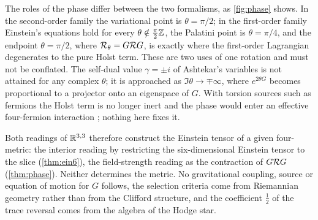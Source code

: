 The roles of the phase differ between the two formalisms, as \cref{fig:phase} shows. In the second-order family the variational point is $\theta=\pi/2$; in the
first-order family Einstein's equations hold for every $\theta\notin\tfrac\pi2\mathbb{Z}$, the Palatini point is $\theta=\pi/4$, and the endpoint $\theta=\pi/2$, where $\mathcal R_\theta=G\mathcal R G$, is
exactly where the first-order Lagrangian degenerates to the pure Holst term. These are two uses of one rotation and must not be conflated. The self-dual value
$\gamma=\pm i$ of Ashtekar's variables is not attained for any complex $\theta$; it is approached as $\Im\theta\to\mp\infty$, where $e^{2\theta G}$ becomes proportional to a
projector onto an eigenspace of $G$. With torsion sources such as fermions the Holst term is no longer inert and the phase would enter an effective four-fermion
interaction \cite{PerezRovelli06,FreidelMinicTakeuchi05}; nothing here fixes it.

Both readings of $\mathbb{R}^{3,3}$ therefore construct the Einstein tensor of a given four-metric: the interior reading by restricting the six-dimensional Einstein tensor to
the slice (\cref{thm:ein6}), the field-strength reading as the contraction of $G\mathcal R G$ (\cref{thm:phase}). Neither determines the metric. No gravitational coupling,
source or equation of motion for $G$ follows, the selection criteria come from Riemannian geometry rather than from the Clifford structure, and the coefficient
$\tfrac12$ of the trace reversal comes from the algebra of the Hodge star.
